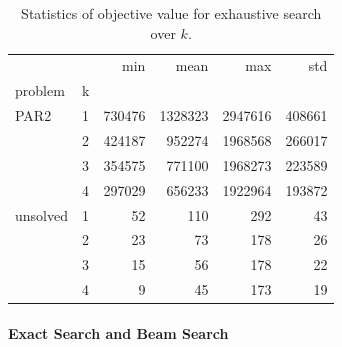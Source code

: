 \documentclass[conference]{IEEEtran}
\begin{document}
\begin{table}[htb]
	\centering
	\caption{Statistics of objective value for exhaustive search over $k$.}
	\label{tab:objective-exhaustive}
	\begin{tabular}{llrrrr}
		\toprule
		&   &     min &     mean &      max &     std \\
		problem & k &         &          &          &         \\
		\midrule
		PAR2 & 1 &  730476 &  1328323 &  2947616 &  408661 \\
		& 2 &  424187 &   952274 &  1968568 &  266017 \\
		& 3 &  354575 &   771100 &  1968273 &  223589 \\
		& 4 &  297029 &   656233 &  1922964 &  193872 \\
		unsolved & 1 &      52 &      110 &      292 &      43 \\
		& 2 &      23 &       73 &      178 &      26 \\
		& 3 &      15 &       56 &      178 &      22 \\
		& 4 &       9 &       45 &      173 &      19 \\
		\bottomrule
	\end{tabular}
\end{table}

\paragraph{Exact Search and Beam Search}
\end{document}
